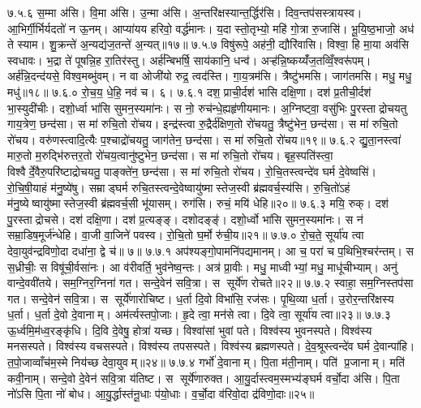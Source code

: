 ७.५.६
स॒म्मा अ॑सि। वि॒मा अ॑सि। उ॒न्मा अ॑सि। अ॒न्तरि॑क्षस्यान्त॒र्द्धिर॑सि। दिव॒न्तप॑सस्त्रायस्व। आ॒भिर्गी॒र्भिर्यदतो॑ न ऊ॒नम्। आप्या॑यय हरिवो॒ वर्द्ध॑मानः। य॒दा स्तो॒तृभ्यो॒ महि॑ गो॒त्रा रु॒जासि॑। भू॒यि॒ष्ठ॒भाजो॒ अध॑ ते स्याम। शु॒क्रन्ते॑ अ॒न्यद्य॑ज॒तन्ते॑ अ॒न्यत्॥१७॥
७.५.७
विषु॑रूपे॒ अह॑नी॒ द्यौरि॑वासि। विश्वा॒ हि मा॒या अव॑सि स्वधावः। भ॒द्रा ते॑ पूषन्नि॒ह रा॒तिर॑स्तु। अर्\mbox{}ह॑न्बिभर्\mbox{}षि॒ साय॑कानि॒ धन्व॑। अऱ्ह॑न्नि॒ष्कय्यँ॑ज॒तव्विँ॒श्वरू॑पम्। अर्\mbox{}ह॑न्नि॒दन्द॑यसे॒ विश्व॒मब्भु॑वम्। न वा ओजी॑यो रुद्र॒ त्वद॑स्ति। गा॒य॒त्रम॑सि। त्रैष्टु॑भमसि। जाग॑तमसि। मधु॒ मधु॒ मधु॑॥१८॥
७.६.०
रो॒च॒य॒ धे॒हि॒ नव॑ च। ६।
\anuvakamend
७.६.१
दश॒ प्राची॒र्दश॑ भासि दक्षि॒णा। दश॑ प्र॒तीची॒र्दश॑ भा॒स्युदी॑चीः। दशो॒र्ध्वा भा॑सि सुमन॒स्यमा॑नः। स नो॒ रुच॑न्धे॒ह्यहृ॑णीयमानः। अ॒ग्निष्ट्वा॒ वसु॑भिः पु॒रस्ताद्रोचयतु गाय॒त्रेण॒ छन्द॑सा। स मा॑ रुचि॒तो रो॑चय। इन्द्र॑स्त्वा रु॒द्रैर्द॑क्षिण॒तो रो॑चयतु॒ त्रैष्टु॑भेन॒ छन्द॑सा। स मा॑ रुचि॒तो रो॑चय। वरु॑णस्त्वादि॒त्यैः प॒श्चाद्रो॑चयतु॒ जाग॑तेन॒ छन्द॑सा। स मा॑ रुचि॒तो रो॑चय॥१९॥
७.६.२
द्यु॒ता॒नस्त्वा॑ मारु॒तो म॒रुद्भि॑रुत्तर॒तो रो॑चय॒त्वानु॑ष्टुभेन॒ छन्द॑सा। स मा॑ रुचि॒तो रो॑चय। बृह॒स्पति॑स्त्वा॒ विश्वैर्दे॒वैरु॒परि॑ष्टाद्रोचयतु॒ पाङ्क्ते॑न॒ छन्द॑सा। स मा॑ रुचि॒तो रो॑चय। रो॒चि॒तस्त्वन्दे॑व घर्म दे॒वेष्वसि॑। रो॒चि॒षी॒याहं म॑नु॒ष्ये॑षु। सम्राड्घर्म रुचि॒तस्त्वन्दे॒वेष्वायु॑ष्मास्तेज॒स्वी ब्र॑ह्मवर्च॒स्य॑सि। रु॒चि॒तो॑ऽहं म॑नु॒ष्येष्वायु॑ष्मास्तेज॒स्वी ब्र॑ह्मवर्च॒सी भू॑यासम्। रुग॑सि। रुचं॒ मयि॑ धेहि॥२०॥
७.६.३
मयि॒ रुक्। दश॑ पु॒रस्ताद्रोचसे। दश॑ दक्षि॒णा। दश॑ प्र॒त्यङ्ङ्। दशोदङ्ङ्॑। दशो॒र्ध्वो भा॑सि सुमन॒स्यमा॑नः। स न॑ सम्रा॒डिष॒मूर्ज॑न्धेहि। वा॒जी वा॒जिने॑ पवस्व। रो॒चि॒तो घ॒र्मो रु॑ची॒य॥२१॥
७.७.०
रो॒च॒ते॒ सूर्या॑य त्वा देवा॒युव॑न्द्रविणो॒दा दधा॑ना॒ द्वे च॑॥ ७॥
\anuvakamend
७.७.१
अप॑श्यङ्गो॒पामनि॑पद्यमानम्। आ च॒ परा॑ च प॒थिभि॒श्चर॑न्तम्। स स॒ध्रीचीः॒ स विषू॑ची॒र्वसा॑नः। आ व॑रीवर्ति॒ भुव॑नेष्व॒न्तः। अत्र॑ प्रा॒वीः। मधु॒ माध्वीभ्यां॒ मधु॒ माधू॑चीभ्याम्। अनु॑ वान्दे॒ववी॑तये। सम॒ग्निर॒ग्निना॑ गत। सन्दे॒वेन॑ सवि॒त्रा। स सूर्ये॑ण रोचते॥२२॥
७.७.२
स्वाहा॒ सम॒ग्निस्तप॑सा गत। सन्दे॒वेन॑ सवि॒त्रा। स सूर्ये॑णारोचिष्ट। ध॒र्ता दि॒वो विभा॑सि॒ रज॑सः। पृ॒थि॒व्या ध॒र्ता। उ॒रोर॒न्तरि॑क्षस्य ध॒र्ता। ध॒र्ता दे॒वो दे॒वानाम्। अम॑र्त्यस्तपो॒जाः। हृ॒दे त्वा॒ मन॑से त्वा। दि॒वे त्वा॒ सूर्या॑य त्वा॥२३॥
७.७.३
ऊ॒र्ध्वमि॒म॑ध्व॒रङ्कृ॑धि। दि॒वि दे॒वेषु॒ होत्रा॑ यच्छ। विश्वा॑सां भुवां पते। विश्व॑स्य भुवनस्पते। विश्व॑स्य मनसस्पते। विश्व॑स्य वचसस्पते। विश्व॑स्य तपसस्पते। विश्व॑स्य ब्रह्मणस्पते। दे॒व॒श्रूस्त्वन्दे॑व घर्म दे॒वान्पा॑हि। त॒पो॒जाव्वाँच॑म॒स्मे निय॑च्छ देवा॒युवम्॥२४॥
७.७.४
गर्भो॑ दे॒वानाम्। पि॒ता म॑ती॒नाम्। पति॑ प्र॒जानाम्। मति॑ कवी॒नाम्। सन्दे॒वो दे॒वेन॑ सवि॒त्रा य॑तिष्ट। स सूर्ये॑णारुक्त। आ॒यु॒र्दास्त्वम॒स्मभ्य॑ङ्घर्म वर्चो॒दा अ॑सि। पि॒ता नो॑ऽसि पि॒ता नो॑ बोध। आ॒यु॒र्द्धास्त॑नू॒धाः प॑यो॒धाः। व॒र्चो॒दा व॑रिवो॒दा द्र॑विणो॒दाः॥२५॥
